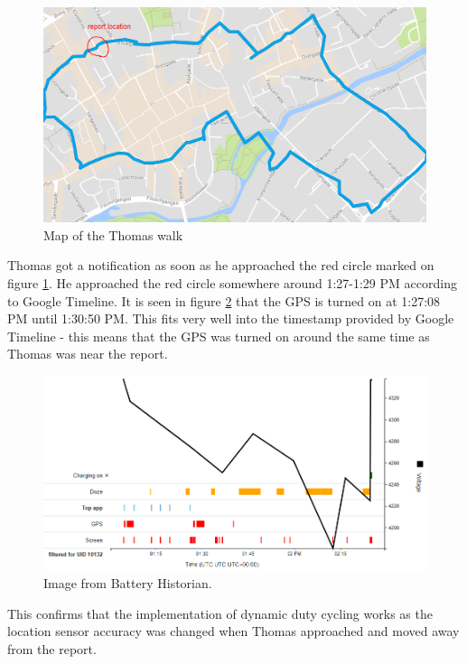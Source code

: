 \begin{figure}[H]
\centering
\includegraphics[width=\linewidth]{images/thomas_walk}
\caption{Map of the Thomas walk} 
\label{fig:thomas_walk}
\end{figure}


Thomas got a notification as soon as he approached the red circle marked on figure \ref{fig:thomas_walk}. He approached the red circle somewhere around 1:27-1:29 PM according to Google Timeline. It is seen in figure \ref{fig:battery_stats_1} that the GPS is turned on at 1:27:08 PM until 1:30:50 PM. This fits very well into the timestamp provided by Google Timeline - this means that the GPS was turned on around the same time as Thomas was near the report.

\begin{figure}[H]
\centering
\includegraphics[width=\linewidth]{images/battery_hist}
\caption{Image from Battery Historian.} 
\label{fig:battery_stats_1}
\end{figure}

This confirms that the implementation of dynamic duty cycling works as the location sensor accuracy was changed when Thomas approached and moved away from the report. 

